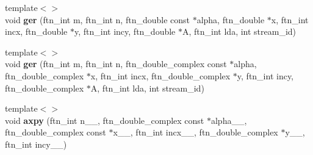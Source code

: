 \begin{DoxyCompactItemize}
\item 
\hypertarget{classsddk_1_1linalg_3_01_g_p_u_01_4_a21a925c87985fed578b73d6c807fa67f}{}{\footnotesize template$<$$>$ }\\void {\bfseries ger} (ftn\+\_\+int m, ftn\+\_\+int n, ftn\+\_\+double const $\ast$alpha, ftn\+\_\+double $\ast$x, ftn\+\_\+int incx, ftn\+\_\+double $\ast$y, ftn\+\_\+int incy, ftn\+\_\+double $\ast$A, ftn\+\_\+int lda, int stream\+\_\+id)\label{classsddk_1_1linalg_3_01_g_p_u_01_4_a21a925c87985fed578b73d6c807fa67f}

\item 
\hypertarget{classsddk_1_1linalg_3_01_g_p_u_01_4_a0ff04649e861af89aaba1d2db236ac19}{}{\footnotesize template$<$$>$ }\\void {\bfseries ger} (ftn\+\_\+int m, ftn\+\_\+int n, ftn\+\_\+double\+\_\+complex const $\ast$alpha, ftn\+\_\+double\+\_\+complex $\ast$x, ftn\+\_\+int incx, ftn\+\_\+double\+\_\+complex $\ast$y, ftn\+\_\+int incy, ftn\+\_\+double\+\_\+complex $\ast$A, ftn\+\_\+int lda, int stream\+\_\+id)\label{classsddk_1_1linalg_3_01_g_p_u_01_4_a0ff04649e861af89aaba1d2db236ac19}

\item 
\hypertarget{classsddk_1_1linalg_3_01_g_p_u_01_4_abba634fea13a40bb6ad4855e8b2a66b4}{}{\footnotesize template$<$$>$ }\\void {\bfseries axpy} (ftn\+\_\+int n\+\_\+\+\_\+, ftn\+\_\+double\+\_\+complex const $\ast$alpha\+\_\+\+\_\+, ftn\+\_\+double\+\_\+complex const $\ast$x\+\_\+\+\_\+, ftn\+\_\+int incx\+\_\+\+\_\+, ftn\+\_\+double\+\_\+complex $\ast$y\+\_\+\+\_\+, ftn\+\_\+int incy\+\_\+\+\_\+)\label{classsddk_1_1linalg_3_01_g_p_u_01_4_abba634fea13a40bb6ad4855e8b2a66b4}

\end{DoxyCompactItemize}
